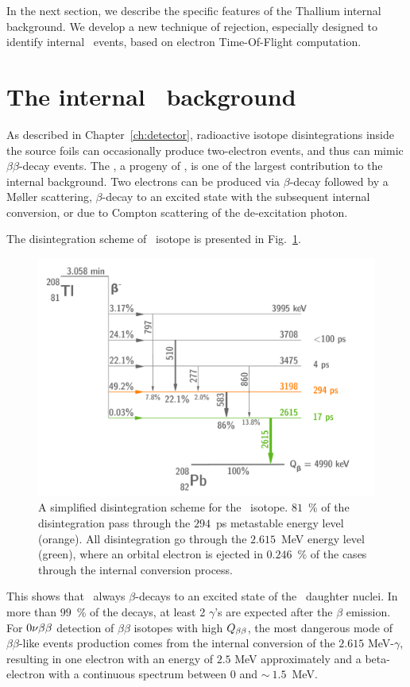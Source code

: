 In the next section, we describe the specific features of the Thallium internal background.
We develop a new technique of rejection, especially designed to identify internal \Tl\ events, based on electron Time-Of-Flight computation.

\section{The internal \Tl\ background}

As described in Chapter~\ref{ch:detector}, radioactive isotope disintegrations inside the source foils can occasionally produce two-electron events, and thus can mimic $\beta\beta$-decay events.
The \Tl, a progeny of \Th, is one of the largest contribution to the internal background.
Two electrons can be produced via $\beta$-decay followed by a M\o{}ller scattering, $\beta$-decay to an excited state with the subsequent internal conversion, or due to Compton scattering of the de-excitation photon.

The disintegration scheme of \Tl\ isotope is presented in Fig.~\ref{fig:Tl_scheme}.
\begin{figure}[!h]
  \centering
  \includegraphics[width=13cm]{timedifference/fig_timediff/Tl_decay_scheme.pdf}
  \caption{A simplified disintegration scheme for the \Tl\ isotope.
    $81$~\% of the disintegration pass through the $294$~ps metastable energy level (orange).
    All disintegration go through the $2.615$~MeV energy level (green), where an orbital electron is ejected in $0.246$~\% of the cases through the internal conversion process.
  \label{fig:Tl_scheme}}
\end{figure}
This shows that \Tl\ always $\beta$-decays to an excited state of the \Pb\ daughter nuclei.
In more than $99$~\% of the decays, at least 2 $\gamma$'s are expected after the $\beta$ emission.
For $0\nu\beta\beta$ detection of $\beta\beta$ isotopes with high $Q_{\beta\beta}$, the most dangerous mode of $\beta\beta$-like events production comes from the internal conversion of the $2.615$ MeV-$\gamma$, resulting in one electron with an energy of $2.5$ MeV approximately and a beta-electron with a continuous spectrum between $0$ and $\sim~1.5$~MeV.

